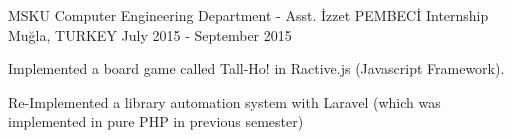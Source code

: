 \begin{cventries}
  \cventry
    {MSKU Computer Engineering Department - Asst. İzzet PEMBECİ}
    {Internship}
    {Muğla, TURKEY}
    {July 2015 - September 2015}
    {
      \begin{cvitems}
        \item {Implemented a board game called Tall-Ho! in Ractive.js (Javascript Framework).}
        \item {Re-Implemented a library automation system with Laravel (which was implemented in pure PHP in previous semester)}
      \end{cvitems}
    }

\end{cventries}
